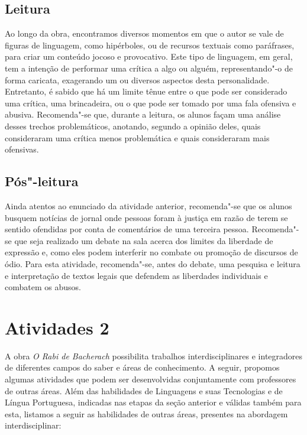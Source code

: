 \documentclass[12pt]{extarticle}
\begin{document}
\subsection{Leitura}


Ao longo da obra, encontramos diversos momentos em que o
autor se vale de figuras de linguagem, como hipérboles, ou de recursos
textuais como paráfrases, para criar um conteúdo jocoso e provocativo.
Este tipo de linguagem, em geral, tem a intenção de performar uma
crítica a algo ou alguém, representando"-o de forma caricata, exagerando
um ou diversos aspectos desta personalidade. Entretanto, é sabido que há
um limite tênue entre o que pode ser considerado uma crítica, uma
brincadeira, ou o que pode ser tomado por uma fala ofensiva e abusiva.
Recomenda"-se que, durante a leitura, os alunos façam uma análise desses
trechos problemáticos, anotando, segundo a opinião deles, quais
consideraram uma crítica menos problemática e quais consideraram mais
ofensivas.

\subsection{Pós"-leitura}


Ainda atentos ao enunciado da atividade anterior,
recomenda"-se que os alunos busquem notícias de jornal onde pessoas foram
à justiça em razão de terem se sentido ofendidas por conta de
comentários de uma terceira pessoa. Recomenda"-se que seja realizado um
debate na sala acerca dos limites da liberdade de expressão e, como eles
podem interferir no combate ou promoção de discursos de ódio. Para esta
atividade, recomenda"-se, antes do debate, uma pesquisa e leitura e
interpretação de textos legais que defendem as liberdades individuais e
combatem os abusos.

\section{Atividades 2}

A obra \emph{O Rabi de Bacherach} possibilita trabalhos
interdisciplinares e integradores de diferentes campos do saber e áreas
de conhecimento. A seguir, propomos algumas atividades que podem ser
desenvolvidas conjuntamente com professores de outras áreas. Além das
habilidades de Linguagens e suas Tecnologias e de Língua Portuguesa,
indicadas nas etapas da seção anterior e válidas também para esta,
listamos a seguir as habilidades de outras áreas, presentes na abordagem
interdisciplinar:
\end{document}
